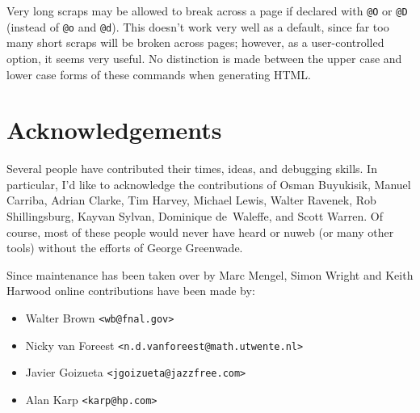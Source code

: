 \documentclass[a4paper]{report}
\begin{document}
Very long scraps may be allowed to break across a page if declared
with \verb|@O| or \verb|@D| (instead of \verb|@o| and \verb|@d|).
This doesn't work very well as a default, since far too many short
scraps will be broken across pages; however, as a user-controlled
option, it seems very useful.  No distinction is made between the
upper case and lower case forms of these commands when generating
HTML\@.

\section{Acknowledgements}

Several people have contributed their times, ideas, and debugging
skills. In particular, I'd like to acknowledge the contributions of
Osman Buyukisik, Manuel Carriba, Adrian Clarke, Tim Harvey, Michael
Lewis, Walter Ravenek, Rob Shillingsburg, Kayvan Sylvan, Dominique
de~Waleffe, and Scott Warren.  Of course, most of these people would
never have heard or nuweb (or many other tools) without the efforts of
George Greenwade.

Since maintenance has been taken over by Marc Mengel, Simon Wright and
Keith Harwood online contributions have been made by:
\begin{itemize}
\item Walter Brown \verb|<wb@fnal.gov>|
\item Nicky van Foreest \verb|<n.d.vanforeest@math.utwente.nl>|
\item Javier Goizueta \verb|<jgoizueta@jazzfree.com>|
\item Alan Karp \verb|<karp@hp.com>|
\end{itemize}




\end{document}
